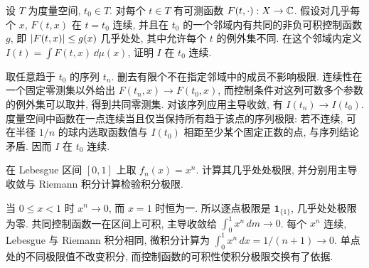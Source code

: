 \begin{exercise}
设 $T$ 为度量空间, $t_0\in T$. 对每个 $t\in T$ 有可测函数 $F(t,\cdot):X\to\mathbb C$. 假设对几乎每个 $x$, $F(t,x)$ 在 $t=t_0$ 连续, 并且在 $t_0$ 的一个邻域内有共同的非负可积控制函数 $g$, 即 $\lvert F(t,x)\rvert\le g(x)$ 几乎处处, 其中允许每个 $t$ 的例外集不同. 在这个邻域内定义 $I(t)=\int F(t,x)\,\dd\mu(x)$, 证明 $I$ 在 $t_0$ 连续.
\end{exercise}
\begin{solution}
取任意趋于 $t_0$ 的序列 $t_n$. 删去有限个不在指定邻域中的成员不影响极限. 连续性在一个固定零测集以外给出 $F(t_n,x)\to F(t_0,x)$, 而控制条件对这列可数多个参数的例外集可以取并, 得到共同零测集. 对该序列应用主导收敛, 有 $I(t_n)\to I(t_0)$. 度量空间中函数在一点连续当且仅当保持所有趋于该点的序列极限: 若不连续, 可在半径 $1/n$ 的球内选取函数值与 $I(t_0)$ 相距至少某个固定正数的点, 与序列结论矛盾. 因而 $I$ 在 $t_0$ 连续.
\end{solution}

\begin{exercise}
在 Lebesgue 区间 $[0,1]$ 上取 $f_n(x)=x^n$. 计算其几乎处处极限, 并分别用主导收敛与 Riemann 积分计算检验积分极限.
\end{exercise}
\begin{solution}
当 $0\le x<1$ 时 $x^n\to0$, 而 $x=1$ 时恒为一. 所以逐点极限是 $\mathbf1_{\{1\}}$, 几乎处处极限为零. 共同控制函数一在区间上可积, 主导收敛给 $\int_0^1x^n\,dm\to0$. 每个 $x^n$ 连续, Lebesgue 与 Riemann 积分相同, 微积分计算为 $\int_0^1x^n\,dx=1/(n+1)\to0$. 单点处的不同极限值不改变积分, 而控制函数的可积性使积分极限交换有了依据.
\end{solution}
